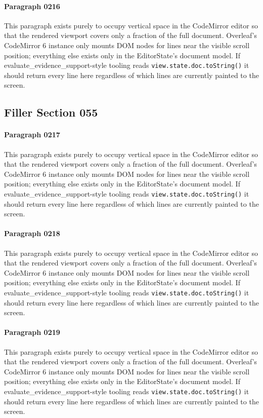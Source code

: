 \documentclass{article}
\begin{document}
\paragraph{Paragraph 0216}
This paragraph exists purely to occupy vertical space in the CodeMirror editor so that the rendered viewport covers only a fraction of the full document. Overleaf's CodeMirror 6 instance only mounts DOM nodes for lines near the visible scroll position; everything else exists only in the EditorState's document model. If evaluate\_evidence\_support-style tooling reads \texttt{view.state.doc.toString()} it should return every line here regardless of which lines are currently painted to the screen.

\subsection{Filler Section 055}
\paragraph{Paragraph 0217}
This paragraph exists purely to occupy vertical space in the CodeMirror editor so that the rendered viewport covers only a fraction of the full document. Overleaf's CodeMirror 6 instance only mounts DOM nodes for lines near the visible scroll position; everything else exists only in the EditorState's document model. If evaluate\_evidence\_support-style tooling reads \texttt{view.state.doc.toString()} it should return every line here regardless of which lines are currently painted to the screen.

\paragraph{Paragraph 0218}
This paragraph exists purely to occupy vertical space in the CodeMirror editor so that the rendered viewport covers only a fraction of the full document. Overleaf's CodeMirror 6 instance only mounts DOM nodes for lines near the visible scroll position; everything else exists only in the EditorState's document model. If evaluate\_evidence\_support-style tooling reads \texttt{view.state.doc.toString()} it should return every line here regardless of which lines are currently painted to the screen.

\paragraph{Paragraph 0219}
This paragraph exists purely to occupy vertical space in the CodeMirror editor so that the rendered viewport covers only a fraction of the full document. Overleaf's CodeMirror 6 instance only mounts DOM nodes for lines near the visible scroll position; everything else exists only in the EditorState's document model. If evaluate\_evidence\_support-style tooling reads \texttt{view.state.doc.toString()} it should return every line here regardless of which lines are currently painted to the screen.
\end{document}
